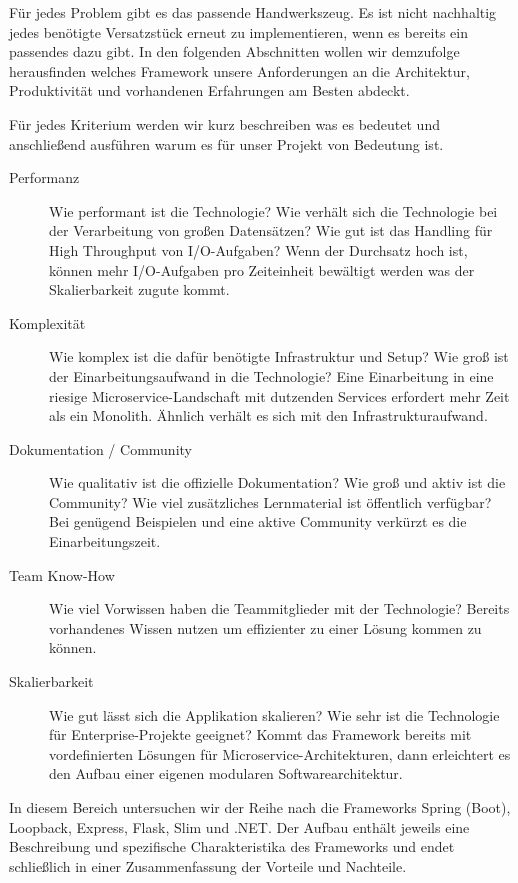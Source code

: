 Für jedes Problem gibt es das passende Handwerkszeug. Es ist nicht nachhaltig jedes benötigte Versatzstück erneut zu implementieren, wenn es bereits ein passendes dazu gibt. In den folgenden Abschnitten wollen wir demzufolge herausfinden welches Framework unsere Anforderungen an die Architektur, Produktivität und vorhandenen Erfahrungen am Besten abdeckt.

Für jedes Kriterium werden wir kurz beschreiben was es bedeutet und anschließend ausführen warum es für unser Projekt von Bedeutung ist.
\begin{description}
    \item [Performanz]
    Wie performant ist die Technologie?
    Wie verhält sich die Technologie bei der Verarbeitung von großen Datensätzen?
    Wie gut ist das Handling für High Throughput von I/O-Aufgaben?
    Wenn der Durchsatz hoch ist, können mehr I/O-Aufgaben pro Zeiteinheit bewältigt werden was der Skalierbarkeit zugute kommt.
    \item [Komplexität]
    Wie komplex ist die dafür benötigte Infrastruktur und Setup?
    Wie groß ist  der Einarbeitungsaufwand in die Technologie?
    Eine Einarbeitung in eine riesige Microservice-Landschaft mit dutzenden Services erfordert mehr Zeit als ein Monolith. Ähnlich verhält es sich mit den Infrastrukturaufwand.
    \item [Dokumentation / Community]
    Wie qualitativ ist die offizielle Dokumentation?
    Wie groß und aktiv ist die Community?
    Wie viel zusätzliches Lernmaterial ist öffentlich verfügbar?
    Bei genügend Beispielen und eine aktive Community verkürzt es die Einarbeitungszeit.
    \item [Team Know-How]
    Wie viel Vorwissen haben die Teammitglieder mit der Technologie?
    Bereits vorhandenes Wissen nutzen um effizienter zu einer Lösung kommen zu können.
    \item [Skalierbarkeit]
    Wie gut lässt sich die Applikation skalieren?
    Wie sehr ist die Technologie für Enterprise-Projekte geeignet?
    Kommt das Framework bereits mit vordefinierten Lösungen für Microservice-Architekturen, dann erleichtert es den Aufbau einer eigenen modularen Softwarearchitektur.
\end{description}

In diesem Bereich untersuchen wir der Reihe nach die Frameworks Spring (Boot), Loopback, Express, Flask, Slim
und .NET. Der Aufbau enthält jeweils eine Beschreibung und spezifische Charakteristika des Frameworks und endet schließlich in einer Zusammenfassung der Vorteile und Nachteile.

